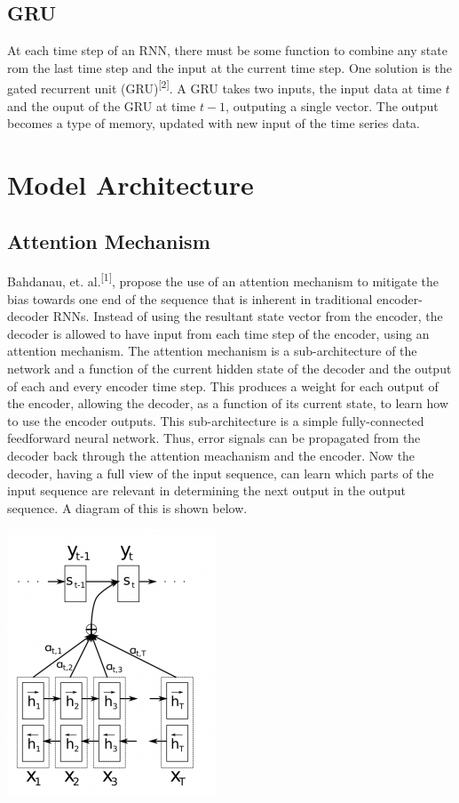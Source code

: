 \documentclass[letterpaper, 11pt]{article}
\begin{document}
\begin{multicols}{2}
\subsection{GRU}

At each time step of an RNN, there must be some function to combine any state rom the last time
step and the input at the current time step.
One solution is the gated recurrent unit (GRU)\textsuperscript{[2]}.
A GRU takes two inputs, the input data at time $t$ and the ouput of the GRU at time $t-1$, outputing
a single vector.
The output becomes a type of memory, updated with new input of the time series data.

\section{Model Architecture}

\subsection{Attention Mechanism}
Bahdanau, et. al.\textsuperscript{[1]}, propose the use of an attention mechanism to mitigate the bias
towards one end of the sequence that is inherent in traditional encoder-decoder RNNs.
Instead of using the resultant state vector from the encoder, the decoder is allowed to have input
from each time step of the encoder, using an attention mechanism.
The attention mechanism is a sub-architecture of the network and a function of the current hidden
state of the decoder and the output of each and every encoder time step.
This produces a weight for each output of the encoder, allowing the decoder, as a function of its
current state, to learn how to use the encoder outputs.
This sub-architecture is a simple fully-connected feedforward neural network.
Thus, error signals can be propagated from the decoder back through the attention meachanism and
the encoder.
Now the decoder, having a full view of the input sequence, can learn which parts of the input
sequence are relevant in determining the next output in the output sequence.
A diagram of this is shown below.

\begin{center}
\includegraphics[scale=.5]{attention_mechanism}
\end{center}


\end{multicols}
\end{document}
